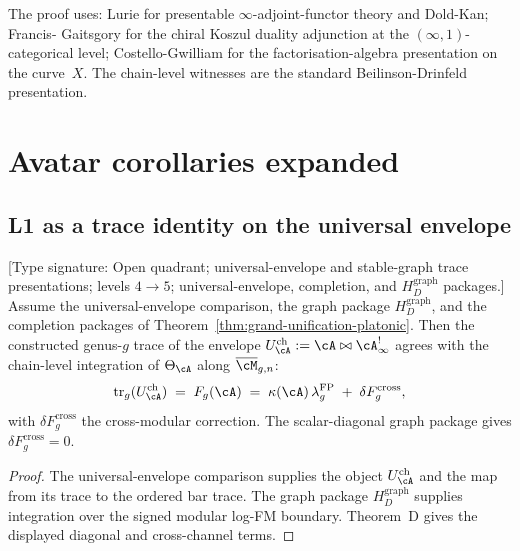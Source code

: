 The proof uses: Lurie \cite[Higher Algebra~5.2, 5.5]{Lurie17} for
presentable $\infty$-adjoint-functor theory and Dold-Kan; Francis-
Gaitsgory \cite{FG12} for the chiral Koszul duality adjunction at
the $(\infty,1)$-categorical level; Costello-Gwilliam \cite{CG17,CG-vol2}
for the factorisation-algebra presentation on the curve~$X$. The
chain-level witnesses are the standard Beilinson-Drinfeld
\cite{BD04} presentation.

\section{Avatar corollaries expanded}
\label{sec:avatar-corollaries-expanded}

\subsection{L1 as a trace identity on the universal envelope}
\label{ssec:L1-trace-identity}

\begin{proposition}
\label{prop:L1-trace-identity-platonic}
\ClaimStatusConditional
\textup{[Type signature: Open quadrant; universal-envelope and
stable-graph trace presentations; levels $4\to5$; universal-envelope,
completion, and $H_D^{\mathrm{graph}}$ packages.]}
Assume the universal-envelope comparison, the graph package
$H_D^{\mathrm{graph}}$, and
the completion packages of Theorem~\ref{thm:grand-unification-platonic}.
Then the constructed genus-$g$ trace of the envelope
$\Uch_\cA := \cA \bowtie \cA^!_\infty$ agrees with the chain-level integration of
$\Theta_\cA$ along $\overline{\cM}_{g,n}$:
\begin{equation}
\label{eq:L1-trace-identity-platonic}
 \trgenus(\Uch_\cA)
 \;=\;
 F_g(\cA)
 \;=\;
 \kappa(\cA)\,\lambda_g^{\mathrm{FP}}
 \;+\;
 \delta F_g^{\mathrm{cross}},
\end{equation}
with $\delta F_g^{\mathrm{cross}}$ the cross-modular correction.  The
scalar-diagonal graph package gives $\delta F_g^{\mathrm{cross}}=0$.
\end{proposition}

\begin{proof}
The universal-envelope comparison supplies the object
$\Uch_\cA$ and the map from its trace to the ordered bar trace. The
graph package $H_D^{\mathrm{graph}}$ supplies integration over the
signed modular log-FM boundary. Theorem~D gives the displayed
diagonal and cross-channel terms.
\end{proof}

